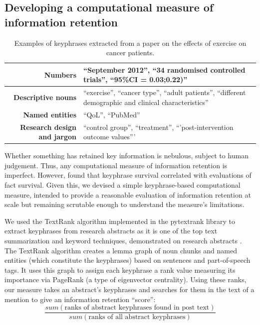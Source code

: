 \documentclass[letterpaper]{article} %
\begin{document}
\subsection{Developing a computational measure of information retention}
\begin{table}[ht]
\centering
\begin{tabular}{r|l}
\textbf{Numbers} & ``September 2012'', ``34 randomised controlled trials'', ``95\%CI = 0.03;0.22)''\\ \hline
\textbf{Descriptive nouns} & ``exercise'', ``cancer type'', ``adult patients'', ``different demographic and clinical characteristics''\\ \hline
\textbf{Named entities} & ``QoL'', ``PubMed''\\ \hline
\textbf{Research design and jargon} & ``control group'', ``treatment'', ``'post-intervention outcome values''' \\
\end{tabular}
\caption{Examples of keyphrases extracted from a paper on the effects of exercise on cancer patients.}
\label{tab:keyphrase_example}
\end{table}

Whether something has retained key information is nebulous, subject to human judgement. Thus, any computational measure of information retention is imperfect. However, \citet{ribeiroMessageDistortionInformation2019} found that keyphrase survival correlated with evaluations of fact survival. Given this, we devised a simple keyphrase-based computational measure, intended to provide a reasonable evaluation of information retention at scale but remaining scrutable enough to understand the measure's limitations.

We used the TextRank algorithm implemented in the pytextrank library to extract keyphrases from research abstracts as it is one of the top text summarization and keyword techniques, demonstrated on research abstracts \citep{mihalceaTextRankBringingOrder2004}.
The TextRank algorithm creates a lemma graph of noun chunks and named entities (which constitute the keyphrases) based on sentences and part-of-speech tags. It uses this graph to assign each keyphrase a rank value measuring its importance via PageRank (a type of eigenvector centrality). %
Using these ranks, our measure takes an abstract's keyphrases and searches for them in the text of a mention to give an information retention ``score'':
$$\frac{sum(\text{ranks of abstract keyphrases found in post text})}{sum(\text{ranks of all abstract keyphrases})}$$
\end{document}
